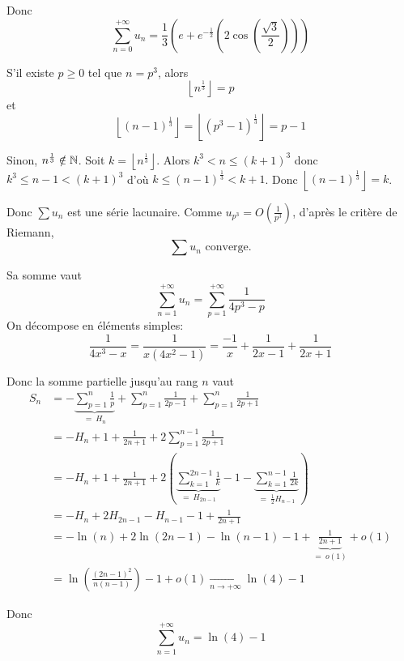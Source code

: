 \begin{solution}
	Donc 
	$$\boxed{\sum_{n=0}^{+\infty} u_{n}=\frac{1}{3}\left(e+e^{-\frac{1}{2}}\left(2\cos\left(\frac{\sqrt{3}}{2}\right)\right)\right)}$$

	\item S'il existe $p\geqslant0$ tel que $n=p^{3}$, alors 
	$$\left\lfloor n^{\frac{1}{3}}\right\rfloor=p$$
	et 
	$$\left\lfloor \left(n-1\right)^{\frac{1}{3}}\right\rfloor=\left\lfloor \left(p^{3}-1\right)^{\frac{1}{3}}\right\rfloor=p-1$$

	Sinon, $n^{\frac{1}{3}}\notin\mathbb{N}$. Soit $k=\left\lfloor n^{\frac{1}{3}}\right\rfloor$. Alors $k^{3}<n\leqslant (k+1)^{3}$ donc $k^{3}\leqslant n-1<(k+1)^{3}$ d'où $k\leqslant (n-1)^{\frac{1}{3}}<k+1$. Donc $\left\lfloor(n-1)^{\frac{1}{3}}\right\rfloor=k$.

	Donc $\sum u_{n}$ est une série lacunaire. Comme $u_{p^{3}}=O\left(\frac{1}{p^{3}}\right)$, d'après le critère de Riemann,
	$$\boxed{\sum u_{n}\text{ converge.}}$$

	Sa somme vaut 
	$$\sum_{n=1}^{+\infty}u_{n}=\sum_{p=1}^{+\infty}\frac{1}{4p^{3}-p}$$
	On décompose en éléments simples:
	$$\frac{1}{4x^{3}-x}=\frac{1}{x(4x^{2}-1)}=\frac{-1}{x}+\frac{1}{2x-1}+\frac{1}{2x+1}$$

	Donc la somme partielle jusqu'au rang $n$ vaut
	\begin{align*}
		S_{n}
		&=-\underbrace{\sum_{p=1}^{n}\frac{1}{p}}_{=~H_{n}}+\sum_{p=1}^{n}\frac{1}{2p-1}+\sum_{p=1}^{n}\frac{1}{2p+1}\\
		&=-H_{n}+1+\frac{1}{2n+1}+2\sum_{p=1}^{n-1}\frac{1}{2p+1}\\
		&=-H_{n}+1+\frac{1}{2n+1}+2\left(\underbrace{\sum_{k=1}^{2n-1}\frac{1}{k}}_{=~H_{2n-1}}-1-\underbrace{\sum_{k=1}^{n-1}\frac{1}{2k}}_{=~\frac{1}{2}H_{n-1}}\right)\\
		&=-H_{n}+2H_{2n-1}-H_{n-1}-1+\frac{1}{2n+1}\\
		&=-\ln(n)+2\ln(2n-1)-\ln(n-1)-1+\underbrace{\frac{1}{2n+1}}_{=~o\left(1\right)}+o\left(1\right)\\
		&=\ln\left(\frac{(2n-1)^{2}}{n(n-1)}\right)-1+o\left(1\right)\xrightarrow[n\to+\infty]{}\ln(4)-1
	\end{align*}

	Donc 
	$$\boxed{\sum_{n=1}^{+\infty}u_{n}=\ln(4)-1}$$
\end{solution}

